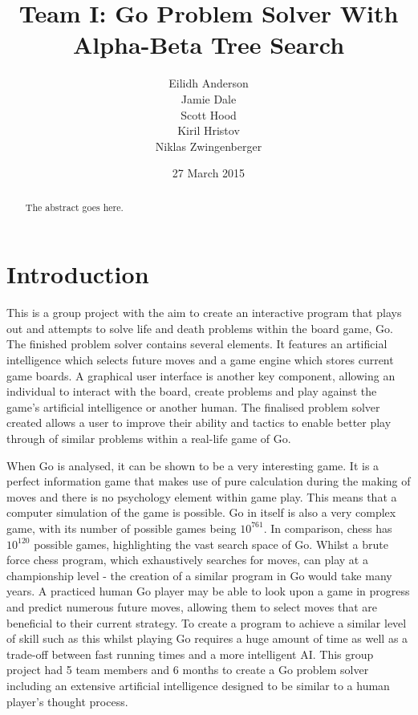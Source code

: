 \documentclass{l3proj}
\begin{document}
\title{Team I: Go Problem Solver With Alpha-Beta Tree Search}
\author{Eilidh Anderson \\
        Jamie Dale \\
        Scott Hood \\
        Kiril Hristov \\
        Niklas Zwingenberger}
\date{27 March 2015}
\maketitle
\begin{abstract}

The abstract goes here.

\end{abstract}
\educationalconsent

\tableofcontents

\chapter{Introduction}
\label{intro}

This is a group project with the aim to create an interactive program that plays out and attempts to solve life and death problems within the board game, Go. The finished problem solver contains several elements. It features an artificial intelligence which selects future moves and a game engine which stores current game boards. A graphical user interface is another key component, allowing an individual to interact with the board, create problems and play against the game's artificial intelligence or another human. The finalised problem solver created allows a user to improve their ability and tactics to enable better play through of similar problems within a real-life game of Go.

When Go is analysed, it can be shown to be a very interesting game. It is a perfect information game that makes use of pure calculation during the making of moves and there is no psychology element within game play. This means that a computer simulation of the game is possible. Go in itself is also a very complex game, with its number of possible games being $10^{761}$. In comparison, chess has $10^{120}$ possible games, highlighting the vast search space of Go. Whilst a brute force chess program, which exhaustively searches for moves, can play at a championship level - the creation of a similar program in Go would take many years. A practiced human Go player may be able to look upon a game in progress and predict numerous future moves, allowing them to select moves that are beneficial to their current strategy. To create a program to achieve a similar level of skill such as this whilst playing Go requires a huge amount of time as well as a trade-off between fast running times and a more intelligent AI. This group project had 5 team members and 6 months to create a Go problem solver including an extensive artificial intelligence designed to be similar to a human player's thought process.
\end{document}
